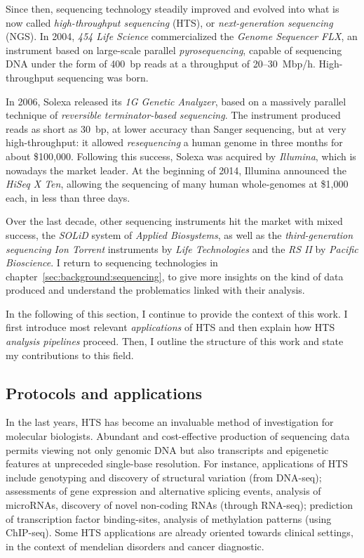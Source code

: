 Since then, sequencing technology steadily improved and evolved into what is now called \emph{high-throughput sequencing} (HTS), or \emph{next-generation sequencing} (NGS).
In 2004, \emph{454 Life Science} commercialized the \emph{Genome Sequencer FLX}, an instrument based on large-scale parallel \emph{pyrosequencing}, capable of sequencing DNA under the form of 400~bp reads at a throughput of 20--30~Mbp/h.
High-throughput sequencing was born.

In 2006, Solexa released its \emph{1G Genetic Analyzer}, based on a massively parallel technique of \emph{reversible terminator-based sequencing}.
The instrument produced reads as short as 30~bp, at lower accuracy than Sanger sequencing, but at very high-throughput: it allowed \emph{resequencing} a human genome in three months for about \$100,000.
Following this success, Solexa was acquired by \emph{Illumina}, which is nowadays the market leader.
At the beginning of 2014, Illumina announced the \emph{HiSeq X Ten}, allowing the sequencing of many human whole-genomes at \$1,000 each, in less than three days.

Over the last decade, other sequencing instruments hit the market with mixed success, \eg the \emph{SOLiD} system of \emph{Applied Biosystems}, as well as the \emph{third-generation sequencing} \emph{Ion Torrent} instruments by \emph{Life Technologies} and the \emph{RS II} by \emph{Pacific Bioscience}.
I return to sequencing technologies in chapter~\ref{sec:background:sequencing}, to give more insights on the kind of data produced and understand the problematics linked with their analysis.

In the following of this section, I continue to provide the context of this work.
I first introduce most relevant \emph{applications} of HTS and then explain how HTS \emph{analysis pipelines} proceed.
Then, I outline the structure of this work and state my contributions to this field.

\subsection{Protocols and applications}

In the last years, HTS has become an invaluable method of investigation for molecular biologists.
Abundant and cost-effective production of sequencing data permits viewing not only genomic DNA but also transcripts and epigenetic features at unpreceded single-base resolution.
For instance, applications of HTS include genotyping and discovery of structural variation (from DNA-seq);
assessments of gene expression and alternative splicing events, analysis of microRNAs, discovery of novel non-coding RNAs (through RNA-seq);
prediction of transcription factor binding-sites, analysis of methylation patterns (using ChIP-seq).
Some HTS applications are already oriented towards clinical settings, \eg in the context of mendelian disorders and cancer diagnostic.

